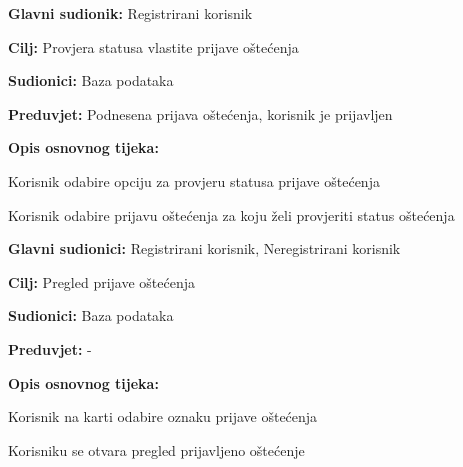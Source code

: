 \noindent {}
\begin{packed_item}

	\item \textbf{Glavni sudionik: } Registrirani korisnik
	\item  \textbf{Cilj:} Provjera statusa vlastite prijave oštećenja
	\item  \textbf{Sudionici:} Baza podataka
	\item  \textbf{Preduvjet:} Podnesena prijava oštećenja, korisnik je prijavljen
	\item  \textbf{Opis osnovnog tijeka:}

	\item[] \begin{packed_enum}

		\item Korisnik odabire opciju za provjeru statusa prijave oštećenja
		\item Korisnik odabire prijavu oštećenja za koju želi provjeriti status oštećenja
	\end{packed_enum}
\end{packed_item}


\noindent {}
\begin{packed_item}

	\item \textbf{Glavni sudionici: } Registrirani korisnik, Neregistrirani korisnik
	\item  \textbf{Cilj:} Pregled prijave oštećenja
	\item  \textbf{Sudionici:} Baza podataka
	\item  \textbf{Preduvjet:} -
	\item  \textbf{Opis osnovnog tijeka:}

	\item[] \begin{packed_enum}

		\item Korisnik na karti odabire oznaku prijave oštećenja
		\item Korisniku se otvara pregled prijavljeno oštećenje 
	\end{packed_enum}
\end{packed_item}


